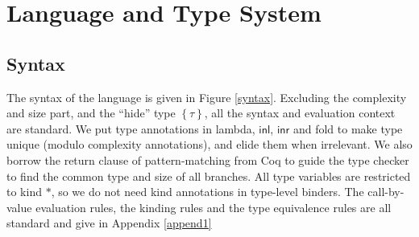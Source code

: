 \documentclass[preprint]{sigplanconf}
\newcommand{\thide}[1]{\left \{ #1 \right \}}
\newcommand{\syminl}{\mathsf{inl}}
\newcommand{\syminr}{\mathsf{inr}}
\begin{document}
\section{\label{section-lang}Language and Type System}

\subsection{Syntax}

The syntax of the language is given in Figure \ref{syntax}. Excluding the complexity and size part, and the ``hide'' type $\thide{\tau}$, all the syntax and evaluation context are standard. We put type annotations in lambda, $\syminl$, $\syminr$ and fold to make type unique (modulo complexity annotations), and elide them when irrelevant. We also borrow the return clause of pattern-matching from Coq to guide the type checker to find the common type and size of all branches. All type variables are restricted to kind $*$, so we do not need kind annotations in type-level binders. The call-by-value evaluation rules, the kinding rules and the type equivalence rules are all standard and give in Appendix \ref{append1}
\end{document}
